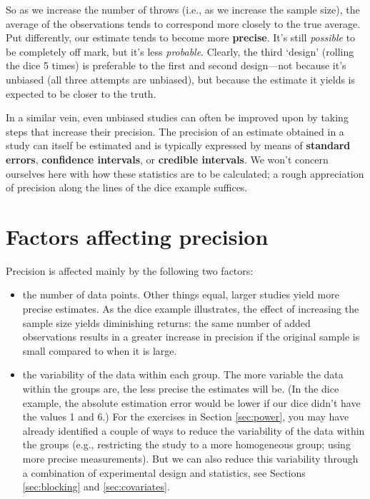 \documentclass[a4paper]{tufte-book}\usepackage[]{graphicx}\usepackage[]{xcolor}
\begin{document}
So as we increase the number of throws (i.e., as we increase the sample size),
the average of the observations tends to correspond more closely to the true average.
Put differently, our estimate tends to become more \textbf{precise}.
It's still \emph{possible} to be completely off mark, but it's less \emph{probable}.
Clearly, the third `design' (rolling the dice 5 times) is preferable to
the first and second design---not because it's unbiased (all three attempts are
unbiased), but because the estimate it yields is expected to be closer to the
truth.

In a similar vein, even unbiased studies can often be improved upon by taking
steps that increase their precision. 
The precision of an estimate obtained in a study can itself be estimated 
and is typically expressed by means of \textbf{standard errors}, 
\textbf{confidence intervals},
or \textbf{credible intervals}. 
We won't concern ourselves here with how these
statistics are to be calculated; 
a rough appreciation of precision along the lines of the dice example suffices.

\section{Factors affecting precision}
Precision is affected mainly by the following two factors:
\begin{itemize}
  \item the number of data points. Other things equal, larger studies
  yield more precise estimates. As the dice example illustrates, the effect
  of increasing the sample size yields diminishing returns:
  the same number of added observations results in a greater increase in precision
  if the original sample is small compared to when it is large.

  \item the variability of the data within each group. The more variable the data
  within the groups are, the less precise the estimates will be.
  (In the dice example, the absolute estimation error would be lower
  if our dice didn't have the values 1 and 6.)
  For the exercises in Section \ref{sec:power}, 
  you may have already identified a couple of ways to reduce the variability of the data within the groups 
  (e.g., restricting the study to a more homogeneous group; 
  using more precise measurements). But we can also
  reduce this variability through a combination of experimental design and
  statistics, see Sections \ref{sec:blocking} and \ref{sec:covariates}.
\end{itemize}
\end{document}
